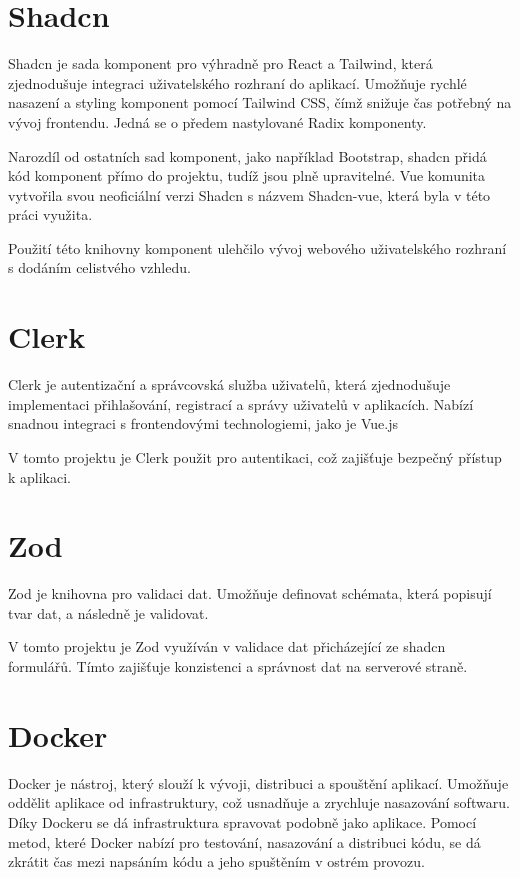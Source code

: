 \section{Shadcn}
Shadcn je sada komponent pro výhradně pro React a Tailwind, která zjednodušuje integraci uživatelského rozhraní do aplikací. Umožňuje rychlé nasazení a styling komponent pomocí Tailwind CSS, čímž snižuje čas potřebný na vývoj frontendu. Jedná se o předem nastylované Radix komponenty.

Narozdíl od ostatních sad komponent, jako například Bootstrap, shadcn přidá kód komponent přímo do projektu, tudíž jsou plně upravitelné. Vue komunita vytvořila svou neoficiální verzi Shadcn s názvem Shadcn-vue, která byla v této práci využita.

Použití této knihovny komponent ulehčilo vývoj webového uživatelského rozhraní s dodáním celistvého vzhledu.

\section{Clerk}
Clerk je autentizační a správcovská služba uživatelů, která zjednodušuje implementaci přihlašování, registrací a správy uživatelů v aplikacích. Nabízí snadnou integraci s frontendovými technologiemi, jako je Vue.js

V tomto projektu je Clerk použit pro autentikaci, což zajišťuje bezpečný přístup k aplikaci.

\section{Zod}
Zod je knihovna pro validaci dat. Umožňuje definovat schémata, která popisují tvar dat, a následně je validovat.

V tomto projektu je Zod využíván v validace dat přicházející ze shadcn formulářů. Tímto zajišťuje konzistenci a správnost dat na serverové straně.

\section{Docker}
Docker je nástroj, který slouží k vývoji, distribuci a spouštění aplikací. Umožňuje oddělit aplikace od infrastruktury, což usnadňuje a zrychluje nasazování softwaru. Díky Dockeru se dá infrastruktura spravovat podobně jako aplikace. Pomocí metod, které Docker nabízí pro testování, nasazování a distribuci kódu, se dá zkrátit čas mezi napsáním kódu a jeho spuštěním v ostrém provozu\cite{a2024_what}.

